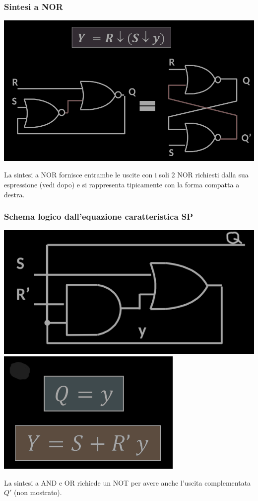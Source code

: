 \documentclass{article}
\begin{document}
\subsubsection*{Sintesi a NOR}
\begin{center}
    \includegraphics[scale=0.3]{latchSR-NOR.png}
\end{center}
La sintesi a NOR fornisce entrambe le uscite con i soli 2 NOR richiesti dalla sua espressione (vedi dopo) e si rappresenta tipicamente con la forma compatta a destra.
\subsubsection*{Schema logico dall'equazione caratteristica SP}
\begin{center}
    \includegraphics[scale=0.3]{latchSR-schema-logico-SP.png}
    \includegraphics[scale=0.3]{latchSR-SP.png}
\end{center}
La sintesi a AND e OR richiede un NOT per avere anche l’uscita complementata $Q'$ (non mostrato).
\end{document}
